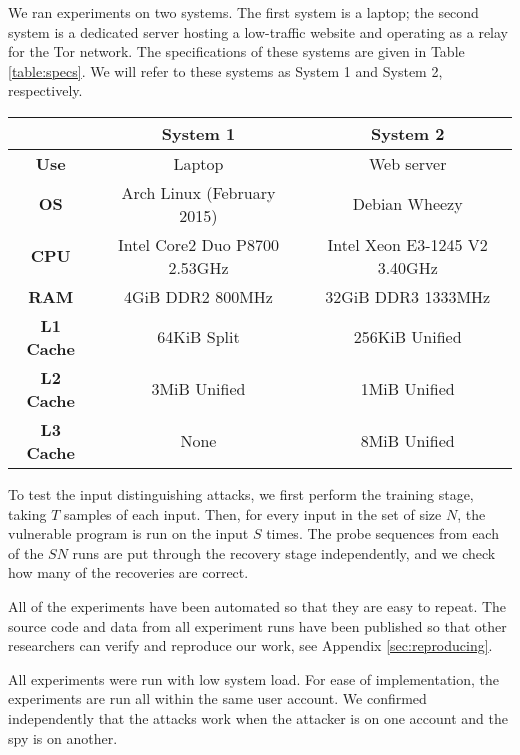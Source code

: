 \documentclass[letterpaper,twocolumn,10pt]{article}
\begin{document}
We ran experiments on two systems. The first system is a laptop; the second
system is a dedicated server hosting a low-traffic website and operating as
a relay for the Tor network. The specifications of these systems are given in
Table \ref{table:specs}. We will refer to these systems as System 1 and System
2, respectively.

\begin{table*}
    \centering
\begin{tabular}{|c|c|c|}
    \hline
    & \textbf{System 1} & \textbf{System 2} \\
    \hline
    \textbf{Use} & Laptop & Web server \\
    \hline
    \textbf{OS} & Arch Linux (February 2015) & Debian Wheezy \\
    \hline
    \textbf{CPU} & Intel Core2 Duo P8700 2.53GHz & Intel Xeon E3-1245 V2 3.40GHz  \\
    \hline
    \textbf{RAM} & 4GiB DDR2 800MHz & 32GiB DDR3 1333MHz \\
    \hline
    \textbf{L1 Cache} & 64KiB Split & 256KiB Unified \\
    \hline
    \textbf{L2 Cache} & 3MiB Unified & 1MiB Unified \\
    \hline
    \textbf{L3 Cache} & None & 8MiB Unified \\
    \hline
\end{tabular}
\caption{System specifications. Cache specifications were obtained by the
\texttt{dmidecode} utility and may not be accurate. System 1 does not have a L3
cache, but FLUSH+RELOAD works with its L2 cache as it is shared between cores.}
\label{table:specs}
\end{table*}

To test the input distinguishing attacks, we first perform the training stage,
taking $T$ samples of each input. Then, for every input in the set of size $N$,
the vulnerable program is run on the input $S$ times. The probe sequences from
each of the $SN$ runs are put through the recovery stage independently, and we
check how many of the recoveries are correct.

All of the experiments have been automated so that they are easy to repeat. The
source code and data from all experiment runs have been published so that other
researchers can verify and reproduce our work, see Appendix
\ref{sec:reproducing}.

All experiments were run with low system load. For ease of implementation, the
experiments are run all within the same user account. We confirmed independently
that the attacks work when the attacker is on one account and the spy is on
another.
\end{document}
